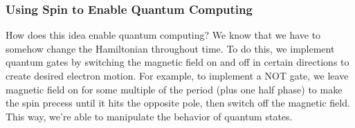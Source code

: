 \subsubsection{Using Spin to Enable Quantum Computing}

How does this idea enable quantum computing? We know that we have to somehow change the Hamiltonian throughout time. To do this, we implement quantum gates by switching the magnetic field on and off in certain directions to create desired electron motion. For example, to implement a NOT gate, we leave magnetic field on for some
multiple of the period (plus one half phase) to make the spin precess until it hits the opposite pole, then switch off the magnetic field. This way, we're able to manipulate the behavior of quantum states.
